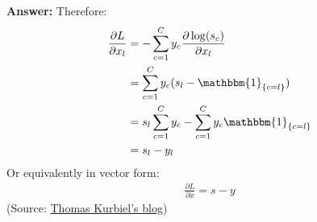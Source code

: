 \documentclass{article}
\newenvironment{QandA}{\begin{enumerate}[label=\arabic*.]}{\end{enumerate}}
\newenvironment{answer}{\par\normalfont \textbf{Answer:}}{}
\newcommand{\Indicator}[1]{\mathbbm{1}_{\left\{ #1 \right\}}}
\begin{document}
\begin{QandA}
\begin{answer}
        Therefore:
        \begin{align*}
            \frac{\partial L}{\partial x_l} &= - \sum_{c=1}^C y_c  \frac{\partial \log (s_c)}{\partial x_l}  \\
            &= \sum_{c=1}^C y_c (s_l - \Indicator{c = l}) \\
            &= s_l \sum_{c=1}^C y_c - \sum_{c=1}^C y_c \Indicator{c = l} \\
            &= s_l - y_l
        \end{align*}
        Or equivalently in vector form:
        \begin{align*}
            \frac{\partial L}{\partial x} = s - y 
        \end{align*}
    (Source:  \href{https://towardsdatascience.com/derivative-of-the-softmax-function-and-the-categorical-cross-entropy-loss-ffceefc081d1}{Thomas Kurbiel's blog})  \end{answer}


\end{QandA}
\end{document}
